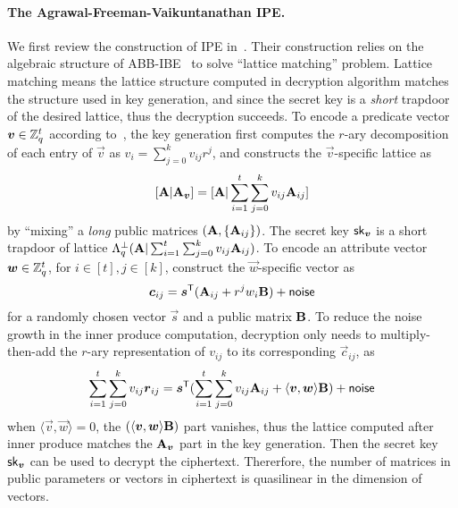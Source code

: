 \paragraph{The Agrawal-Freeman-Vaikuntanathan IPE.}We first review the construction of IPE in~\cite{AC:AgrFreVai11}. Their construction relies on the algebraic structure of ABB-IBE~\cite{EC:AgrBonBoy10} to solve ``lattice matching'' problem. Lattice matching means the lattice structure computed in decryption algorithm matches the structure used in key generation, and since the secret key is a \emph{short} trapdoor of the desired lattice, thus the decryption succeeds. To encode a predicate vector $\boldsymbol{v} \in \mathbb{Z}_q^t$ according to~\cite{AC:AgrFreVai11}, the key generation first computes the $r$-ary decomposition of each entry of $\vec{v}$ as $v_i = \sum_{j = 0}^k v_{ij} r^j$, and constructs the $\vec{v}$-specific lattice as
$$[\mathbf{A} | \mathbf{A}_{\boldsymbol{v}}] = [\mathbf{A} | \sum_{i = 1}^t \sum_{j = 0}^k v_{ij} \mathbf{A}_{ij}]$$
by ``mixing'' a \emph{long} public matrices $(\mathbf{A}, \{\mathbf{A}_{ij}\})$. The secret key $\mathsf{sk}_{\boldsymbol{v}}$ is a short trapdoor of lattice $\Lambda_q^{\bot}(\mathbf{A} | \sum_{i = 1}^t \sum_{j = 0}^k v_{ij} \mathbf{A}_{ij})$. To encode an attribute vector $\boldsymbol{w} \in \mathbb{Z}_q^{t}$, for $i \in [t], j \in [k]$, construct the $\vec{w}$-specific vector as
$$\boldsymbol{c}_{ij} = \boldsymbol{s}^{\mathsf{T}} ( \mathbf{A}_{ij} + r^j w_i \mathbf{B}) + \mathsf{noise}$$
for a randomly chosen vector $\vec{s}$ and a public matrix $\mathbf{B}$. To reduce the noise growth in the inner produce computation, decryption only needs to multiply-then-add the $r$-ary representation of $v_{ij}$ to its corresponding $\vec{c}_{ij}$, as
$$\sum_{i = 1}^t \sum_{j = 0}^k v_{ij}\boldsymbol{r}_{ij} = \boldsymbol{s}^{\mathsf{T}} (\sum_{i = 1}^t \sum_{j = 0}^k v_{ij} \mathbf{A}_{ij} + \langle\boldsymbol{v}, \boldsymbol{w}\rangle \mathbf{B}) + \mathsf{noise}$$
when $\langle\vec{v}, \vec{w}\rangle = 0$, the $(\langle\boldsymbol{v}, \boldsymbol{w}\rangle \mathbf{B})$ part vanishes, thus the lattice computed after inner produce matches the $\mathbf{A}_{\boldsymbol{v}}$ part in the key generation. Then the secret key $\mathsf{sk}_{\boldsymbol{v}}$ can be used to decrypt the ciphertext. Thererfore, the number of matrices in public parameters or vectors in ciphertext is quasilinear in the dimension of vectors.


